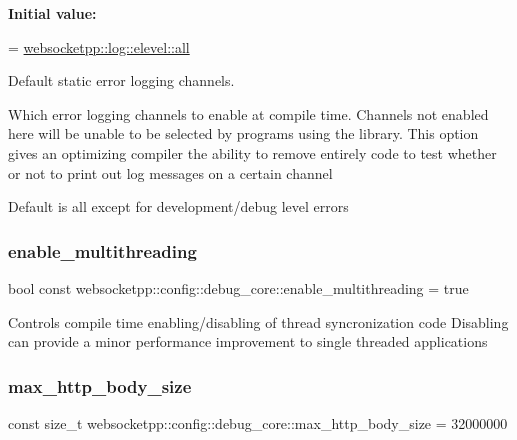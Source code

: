 {\bfseries Initial value\+:}
\begin{DoxyCode}
=
        \mbox{\hyperlink{structwebsocketpp_1_1log_1_1elevel_a9b31ff708c221d314f9f4eb3ff2b1ad7}{websocketpp::log::elevel::all}}
\end{DoxyCode}


Default static error logging channels. 

Which error logging channels to enable at compile time. Channels not enabled here will be unable to be selected by programs using the library. This option gives an optimizing compiler the ability to remove entirely code to test whether or not to print out log messages on a certain channel

Default is all except for development/debug level errors \mbox{\label{structwebsocketpp_1_1config_1_1debug__core_acbf3aa1de5fc4dacbdb7866375791409}} 
\subsubsection{\texorpdfstring{enable\+\_\+multithreading}{enable\_multithreading}}
{\footnotesize\ttfamily bool const websocketpp\+::config\+::debug\+\_\+core\+::enable\+\_\+multithreading = true\hspace{0.3cm}{\ttfamily [static]}}

Controls compile time enabling/disabling of thread syncronization code Disabling can provide a minor performance improvement to single threaded applications \mbox{\label{structwebsocketpp_1_1config_1_1debug__core_a95ea7d50bc0617bc447d98dca1ea7e0d}} 
\subsubsection{\texorpdfstring{max\+\_\+http\+\_\+body\+\_\+size}{max\_http\_body\_size}}
{\footnotesize\ttfamily const size\+\_\+t websocketpp\+::config\+::debug\+\_\+core\+::max\+\_\+http\+\_\+body\+\_\+size = 32000000\hspace{0.3cm}{\ttfamily [static]}}



